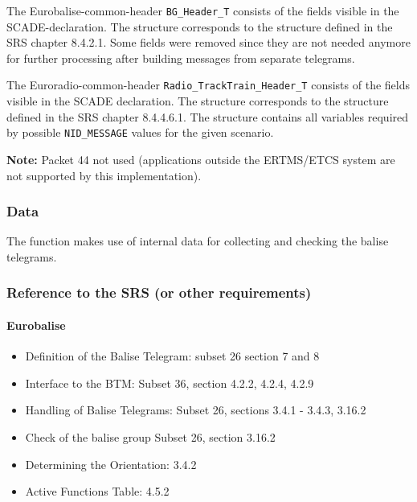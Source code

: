 \documentclass{template/openetcs_report}
\begin{document}
The Eurobalise-common-header \texttt{BG\_Header\_T} consists of the fields visible in the SCADE-declaration. The structure corresponds to the structure defined in the SRS chapter 8.4.2.1. Some fields were removed since they are not needed anymore for further processing after building messages from separate telegrams.

The Euroradio-common-header \texttt{Radio\_TrackTrain\_Header\_T} consists of the fields visible in the SCADE declaration. The structure corresponds to the structure defined in the SRS chapter 8.4.4.6.1. The structure contains all variables required by possible \texttt{NID\_MESSAGE} values for the given scenario.



\textbf{Note:} Packet 44 not used (applications outside the ERTMS/ETCS system are not supported by this implementation).


\subsubsection{Data}
The function makes use of internal data for collecting and checking the balise telegrams.

\subsubsection{Reference to the SRS (or other requirements)}
\paragraph{Eurobalise}
\begin{itemize}
  \item Definition of the Balise Telegram: subset 26 section 7 and 8
  \item Interface to the BTM: Subset 36, section  4.2.2, 4.2.4, 4.2.9
  \item Handling of Balise Telegrams: Subset 26, sections 3.4.1 - 3.4.3, 3.16.2
  \item Check of the balise group Subset 26, section 3.16.2
  \item Determining the Orientation: 3.4.2
  \item Active Functions Table: 4.5.2
\end{itemize}
\end{document}
